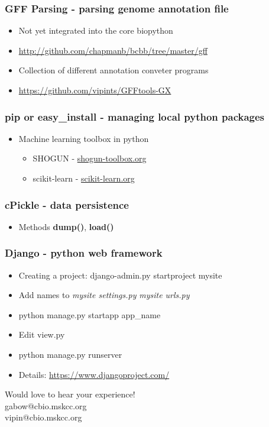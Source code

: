 \documentclass[11pt]{beamer}
\makeatletter
\newcommand{\thankyou}
{\begin{center} Would love to hear your experience! \\  gabow@cbio.mskcc.org \\ vipin@cbio.mskcc.org \end{center}}
\makeatother
\begin{document}
%
\begin{frame}[plain]
    \frametitle{GFF Parsing - parsing genome annotation file}
    \begin{itemize}
        \item[] Not yet integrated into the core biopython  
        \item[] \url{http://github.com/chapmanb/bcbb/tree/master/gff}  
        \newline
        \item[] Collection of different annotation conveter programs 
        \item[] \url{https://github.com/vipints/GFFtools-GX} 
    \end{itemize}
\end{frame}
%
\begin{frame}[plain]
    \frametitle{\textbf{pip} or \textbf{easy\_install} - managing local python packages}
    \begin{itemize}
        \item[] Machine learning toolbox in python
        \begin{itemize}
            \item []SHOGUN - \url{shogun-toolbox.org}
            \item []scikit-learn - \url{scikit-learn.org} 
        \end{itemize}
        
    \end{itemize}
\end{frame}
%
\begin{frame}[plain]
    \frametitle{\textbf{cPickle} - data persistence}
    \begin{itemize}
        \item[] Methods \textbf{dump()}, \textbf{load()} 
        \newline
        
        
    \end{itemize}
\end{frame}
%
\begin{frame}[plain]
    \frametitle{\textbf{Django} - python web framework}
    \begin{itemize}
        \item[] Creating a project: django-admin.py startproject mysite 
        \newline
        \item[] Add names to \textit{mysite settings.py} \textit{mysite urls.py} 
        \item[] python manage.py startapp app\_name
        \item[] Edit view.py 
        
        \item[] python manage.py runserver
        \item[] Details: \url{https://www.djangoproject.com/}
    \end{itemize}
\end{frame}
%
\begin{frame}[plain]
    \thankyou
\end{frame}
\end{document}
